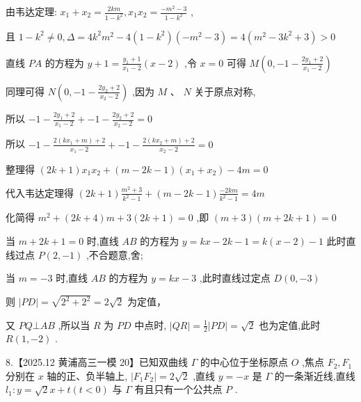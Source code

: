 \documentclass[10pt]{article}
\begin{document}
由韦达定理: \({x}_{1} + {x}_{2} = \frac{2km}{1 - {k}^{2}},{x}_{1}{x}_{2} = \frac{-{m}^{2} - 3}{1 - {k}^{2}}\) ,

且 \(1 - {k}^{2} \neq  0,\Delta  = 4{k}^{2}{m}^{2} - 4\left( {1 - {k}^{2}}\right) \left( {-{m}^{2} - 3}\right)  = 4\left( {{m}^{2} - 3{k}^{2} + 3}\right)  > 0\)

直线 \({PA}\) 的方程为 \(y + 1 = \frac{{y}_{1} + 1}{{x}_{1} - 2}\left( {x - 2}\right)\) ,令 \(x = 0\) 可得 \(M\left( {0, - 1 - \frac{2{y}_{1} + 2}{{x}_{1} - 2}}\right)\)

同理可得 \(N\left( {0, - 1 - \frac{2{y}_{2} + 2}{{x}_{2} - 2}}\right)\) ,因为 \(M\text{ 、 }N\) 关于原点对称,

所以 \(- 1 - \frac{2{y}_{1} + 2}{{x}_{1} - 2} +  - 1 - \frac{2{y}_{2} + 2}{{x}_{2} - 2} = 0\)

所以 \(- 1 - \frac{2\left( {k{x}_{1} + m}\right)  + 2}{{x}_{1} - 2} +  - 1 - \frac{2\left( {k{x}_{2} + m}\right)  + 2}{{x}_{2} - 2} = 0\)

整理得 \(\left( {{2k} + 1}\right) {x}_{1}{x}_{2} + \left( {m - {2k} - 1}\right) \left( {{x}_{1} + {x}_{2}}\right)  - {4m} = 0\)

代入韦达定理得 \(\left( {{2k} + 1}\right) \frac{{m}^{2} + 3}{{k}^{2} - 1} + \left( {m - {2k} - 1}\right) \frac{-{2km}}{{k}^{2} - 1} = {4m}\)

化简得 \({m}^{2} + \left( {{2k} + 4}\right) m + 3\left( {{2k} + 1}\right)  = 0\) ,即 \(\left( {m + 3}\right) \left( {m + {2k} + 1}\right)  = 0\)

当 \(m + {2k} + 1 = 0\) 时,直线 \({AB}\) 的方程为 \(y = {kx} - {2k} - 1 = k\left( {x - 2}\right)  - 1\) 此时直线过点 \(P\left( {2, - 1}\right)\) ,不合题意,舍;

当 \(m =  - 3\) 时,直线 \({AB}\) 的方程为 \(y = {kx} - 3\) ,此时直线过定点 \(D\left( {0, - 3}\right)\)

则 \(\left| {PD}\right|  = \sqrt{{2}^{2} + {2}^{2}} = 2\sqrt{2}\) 为定值，

又 \({PQ} \bot  {AB}\) ,所以当 \(R\) 为 \({PD}\) 中点时, \(\left| {QR}\right|  = \frac{1}{2}\left| {PD}\right|  = \sqrt{2}\) 也为定值,此时 \(R\left( {1, - 2}\right)\) .

8.【2025.12 黄浦高三一模 20】已知双曲线 \(\Gamma\) 的中心位于坐标原点 \(O\) ,焦点 \({F}_{2},{F}_{1}\) 分别在 \(x\) 轴的正、负半轴上, \(\left| {{F}_{1}{F}_{2}}\right|  = 2\sqrt{2}\) ,直线 \(y =  - x\) 是 \(\Gamma\) 的一条渐近线,直线 \({l}_{1} : y = \sqrt{2}x + t\left( {t < 0}\right)\) 与 \(\Gamma\) 有且只有一个公共点 \(P\) .
\end{document}
